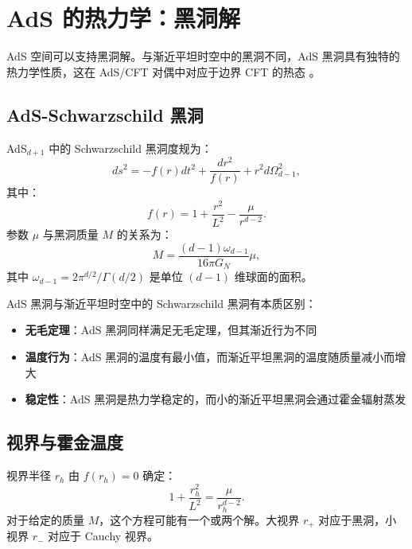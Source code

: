 \section{AdS 的热力学：黑洞解}

AdS 空间可以支持黑洞解。与渐近平坦时空中的黑洞不同，AdS 黑洞具有独特的热力学性质，这在 AdS/CFT 对偶中对应于边界 CFT 的热态 \cite{Hawking1983, Maldacena1997}。

\subsection{AdS-Schwarzschild 黑洞}

\begin{definition}
AdS$_{d+1}$ 中的 Schwarzschild 黑洞度规为：
\begin{equation}
    ds^2 = -f(r) dt^2 + \frac{dr^2}{f(r)} + r^2 d\Omega_{d-1}^2,
    \label{eq:AdS_Schwarzschild}
\end{equation}
其中：
\begin{equation}
    f(r) = 1 + \frac{r^2}{L^2} - \frac{\mu}{r^{d-2}}.
\end{equation}
参数 $\mu$ 与黑洞质量 $M$ 的关系为：
\begin{equation}
    M = \frac{(d-1) \omega_{d-1}}{16\pi G_N} \mu,
\end{equation}
其中 $\omega_{d-1} = 2\pi^{d/2}/\Gamma(d/2)$ 是单位 $(d-1)$ 维球面的面积。
\end{definition}

\begin{note}[与渐近平坦黑洞的区别]
AdS 黑洞与渐近平坦时空中的 Schwarzschild 黑洞有本质区别：
\begin{itemize}
    \item \textbf{无毛定理}：AdS 黑洞同样满足无毛定理，但其渐近行为不同
    \item \textbf{温度行为}：AdS 黑洞的温度有最小值，而渐近平坦黑洞的温度随质量减小而增大
    \item \textbf{稳定性}：AdS 黑洞是热力学稳定的，而小的渐近平坦黑洞会通过霍金辐射蒸发
\end{itemize}
\end{note}

\subsection{视界与霍金温度}

视界半径 $r_h$ 由 $f(r_h) = 0$ 确定：
\begin{equation}
    1 + \frac{r_h^2}{L^2} = \frac{\mu}{r_h^{d-2}}.
\end{equation}
对于给定的质量 $M$，这个方程可能有一个或两个解。大视界 $r_+$ 对应于黑洞，小视界 $r_-$ 对应于 Cauchy 视界。

